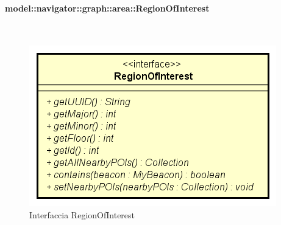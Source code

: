 \documentclass[../DefinizioneDiProdotto.tex]{subfiles}
\begin{document}
\paragraph{model::navigator::graph::area::RegionOfInterest}
\
\begin{figure}[H]
	\centering
	\includegraphics[width=\maxwidth]{img/RegionOfInterest.png}
	\caption{Interfaccia RegionOfInterest}\label{fig:model::navigator::graph::area::RegionOfInterest} 
\end{figure}
\end{document}
